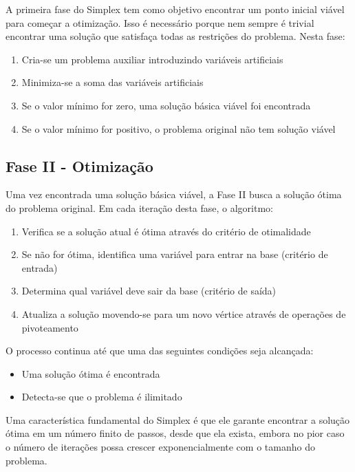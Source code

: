 \documentclass{article}
\begin{document}
A primeira fase do Simplex tem como objetivo encontrar um ponto inicial viável para começar a otimização. Isso é necessário porque nem sempre é trivial encontrar uma solução que satisfaça todas as restrições do problema. Nesta fase:

\begin{enumerate}
    \item Cria-se um problema auxiliar introduzindo variáveis artificiais
    \item Minimiza-se a soma das variáveis artificiais
    \item Se o valor mínimo for zero, uma solução básica viável foi encontrada
    \item Se o valor mínimo for positivo, o problema original não tem solução viável
\end{enumerate}

\subsection{Fase II - Otimização}

Uma vez encontrada uma solução básica viável, a Fase II busca a solução ótima do problema original. Em cada iteração desta fase, o algoritmo:

\begin{enumerate}
    \item Verifica se a solução atual é ótima através do critério de otimalidade
    \item Se não for ótima, identifica uma variável para entrar na base (critério de entrada)
    \item Determina qual variável deve sair da base (critério de saída)
    \item Atualiza a solução movendo-se para um novo vértice através de operações de pivoteamento
\end{enumerate}

O processo continua até que uma das seguintes condições seja alcançada:
\begin{itemize}
    \item Uma solução ótima é encontrada
    \item Detecta-se que o problema é ilimitado
\end{itemize}

Uma característica fundamental do Simplex é que ele garante encontrar a solução ótima em um número finito de passos, desde que ela exista, embora no pior caso o número de iterações possa crescer exponencialmente com o tamanho do problema.
\end{document}
